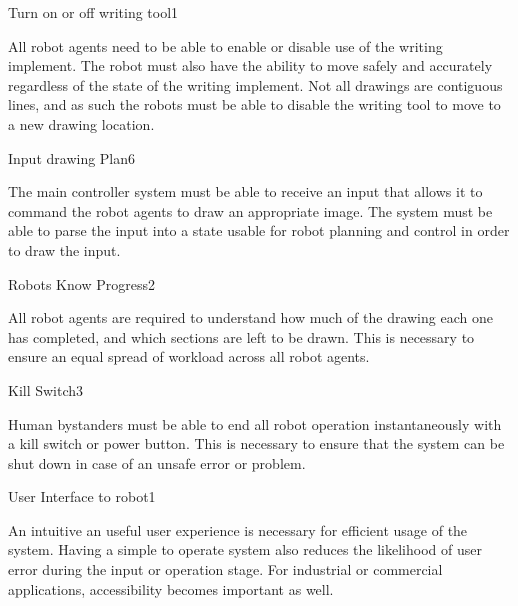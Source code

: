\begin{functional_requirement}{Turn on or off writing tool}{1}
\item All robot agents need to be able to enable or disable use of the writing implement. The robot must also have the ability to move safely and accurately regardless of the state of the writing implement. Not all drawings are contiguous lines, and as such the robots must be able to disable the writing tool to move to a new drawing location.
\end{functional_requirement}

\begin{functional_requirement}{Input drawing Plan}{6}
\item The main controller system must be able to receive an input that allows it to command the robot agents to draw an appropriate image. The system must be able to parse the input into a state usable for robot planning and control in order to draw the input.
\end{functional_requirement}

\begin{functional_requirement}{Robots Know Progress}{2}
\item All robot agents are required to understand how much of the drawing each one has completed, and which sections are left to be drawn. This is necessary to ensure an equal spread of workload across all robot agents.
\end{functional_requirement}

\begin{functional_requirement}{Kill Switch}{3}
\item Human bystanders must be able to end all robot operation instantaneously with a kill switch or power button. This is necessary to ensure that the system can be shut down in case of an unsafe error or problem.
\end{functional_requirement}

\begin{functional_requirement}{User Interface to robot}{1}
\item An intuitive an useful user experience is necessary for efficient usage of the system. Having a simple to operate system also reduces the likelihood of user error during the input or operation stage. For industrial or commercial applications, accessibility becomes important as well. 
\end{functional_requirement}

